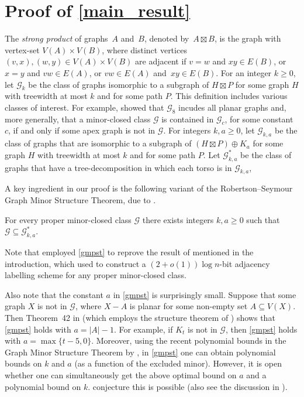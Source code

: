 \documentclass{patmorin}
\renewcommand{\geq}{\geqslant}
\newcommand{\defin}[1]{\emph{\textcolor{brightmaroon}{#1}}}
\newcommand{\calG}{\mathcal{G}}
\begin{document}
  \section{Proof of \cref{main_result}}
  \label{gpmst_section}

The \defin{strong product} of graphs~$A$ and~$B$, denoted by~${A \boxtimes B}$, is the graph with vertex-set ${V(A) \times V(B)}$, where distinct vertices ${(v,x),(w,y) \in V(A) \times V(B)}$ are adjacent if
	${v=w}$ and ${xy \in E(B)}$, or
	${x=y}$ and ${vw \in E(A)}$, or
	${vw \in E(A)}$ and~${xy \in E(B)}$.
For an integer $k\geq 0$, let \defin{$\calG_{k}$} be the class of graphs isomorphic to a subgraph of $H\boxtimes P$ for some graph $H$ with treewidth at most $k$ and for some path $P$. This definition includes various classes of interest. For example, \citet{dujmovic.joret.ea:planar} showed that
$\calG_{8}$ incudes all planar graphs and, more generally, that a minor-closed class $\calG$ is contained in $\calG_c$, for some constant $c$, if and only if some apex graph is not in $\calG$. For integers $k,a\geq 0$, let \defin{$\calG_{k,a}$} be the class of graphs that are isomorphic to a subgraph of $(H\boxtimes P)\oplus K_a$ for some graph $H$ with treewidth at most $k$ and for some path $P$. Let \defin{$\calG^*_{k,a}$} be the class of graphs that have a tree-decomposition in which each torso is in $\calG_{k,a}$,

A key ingredient in our proof is the following variant of the Robertson--Seymour Graph Minor Structure Theorem, due to \citet{dujmovic.joret.ea:planar}.

  \begin{thm}
  \label{gmpst}
  For every proper minor-closed class $\calG$ there exists integers $k,a\geq 0$ such that $\calG \subseteq \calG^*_{k,a}$.
  \end{thm}

Note that \citet{dujmovic.joret.ea:planar} employed \cref{gmpst} to reprove the result of \citet{devos2004} mentioned in the introduction, which \citet{gavoille.labourel:shorter} used to construct a ${(2+o(1))\log n}$-bit adjacency labelling scheme for any proper minor-closed class.

Also note that the constant $a$ in \cref{gmpst} is surprisingly small. Suppose that some graph $X$ is not in $\calG$, where $X-A$ is planar for some non-empty set $A\subseteq V(X)$. Then Theorem~42 in \citep{dujmovic.joret.ea:planar} (which employs the structure theorem of \citet{DvoTho}) shows that \cref{gmpst} holds with $a=|A|-1$. For example, if $K_t$ is not in $\calG$, then \cref{gmpst} holds with $a=\max\{t-5,0\}$. Moreover, using the recent polynomial bounds in the Graph Minor Structure Theorem by \citet{gorsky2025polynomial}, in \cref{gmpst} one can obtain polynomial bounds on $k$ and $a$ (as a function of the excluded minor). However, it is open whether one can simultaneously get the above optimal bound on $a$ and a polynomial bound on $k$. \citet[Conjecture~18.9]{gorsky2025polynomial} conjecture this is possible (also see the discussion in \citep{GSW26}).
\end{document}
